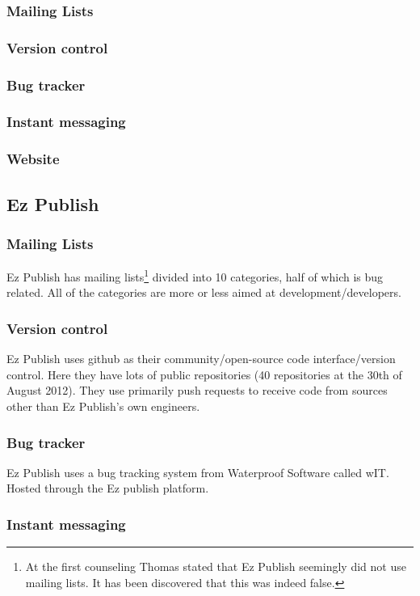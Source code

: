\documentclass{report} %
\begin{document}
\subsubsection{Mailing Lists}
\subsubsection{Version control}
\subsubsection{Bug tracker}
\subsubsection{Instant messaging}
\subsubsection{Website}

\subsection{Ez Publish}
\subsubsection{Mailing Lists}
Ez Publish has mailing lists\cite{ezpubwebmaillists}\footnote{At the first counseling Thomas stated that Ez Publish seemingly did not use mailing lists. It has been discovered that this was indeed false.} divided into 10 categories, half of which is bug related. All of the categories are more or less aimed at development/developers.
\subsubsection{Version control}
Ez Publish uses github\cite{ezpubgithub} as their community/open-source code interface/version control. Here they have lots of public repositories (40 repositories at the 30th of August 2012). They use primarily push requests to receive code from sources other than Ez Publish's own engineers. %
\subsubsection{Bug tracker}
Ez Publish uses a bug tracking system from Waterproof Software\cite{waterproofweb} called wIT\cite{waterproofwebwit}. Hosted through the Ez publish platform.
\subsubsection{Instant messaging} %
\end{document}
